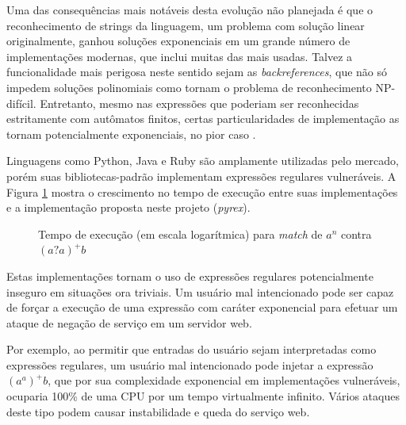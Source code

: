 \documentclass[a4paper,12pt,oneside,onecolumn]{uerj}
\begin{document}
Uma das consequências mais notáveis desta evolução não planejada é que o reconhecimento de strings da linguagem, um problema com solução linear originalmente, ganhou soluções exponenciais em um grande número de implementações modernas, que inclui muitas das mais usadas. Talvez a funcionalidade mais perigosa neste sentido sejam as \emph{backreferences}, que não só impedem soluções polinomiais como tornam o problema de reconhecimento NP-difícil. Entretanto, mesmo nas expressões que poderiam ser reconhecidas estritamente com autômatos finitos, certas particularidades de implementação as tornam potencialmente exponenciais, no pior caso \cite{bib:Cox07}.

Linguagens como Python, Java e Ruby são amplamente utilizadas pelo mercado, porém suas bibliotecas-padrão implementam expressões regulares vulneráveis. A Figura \ref{fig:benchmark1} mostra o crescimento no tempo de execução entre suas implementações e a implementação proposta neste projeto (\emph{pyrex}).

\begin{figure}[!htbp]
\centering
{}
\caption{Tempo de execução (em escala logarítmica) para \emph{match} de $a^n$ contra $(a?a)^+b$}
\label{fig:benchmark1}
\end{figure}

Estas implementações tornam o uso de expressões regulares potencialmente inseguro em situações ora triviais. Um usuário mal intencionado pode ser capaz de forçar a execução de uma expressão com caráter exponencial para efetuar um ataque de negação de serviço em um servidor web. 

Por exemplo, ao permitir que entradas do usuário sejam interpretadas como expressões regulares, um usuário mal intencionado pode injetar a expressão $(a^a)^+b$, que por sua complexidade exponencial em implementações vulneráveis, ocuparia 100\% de uma CPU por um tempo virtualmente infinito. Vários ataques deste tipo podem causar instabilidade e queda do serviço web.
\end{document}
